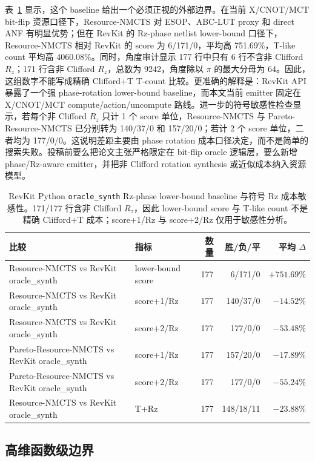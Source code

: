 \documentclass[UTF8,fontset=macnew,11pt]{ctexart}
\newcommand{\method}{Resource-NMCTS}
\newcommand{\mct}{\ensuremath{\mathrm{MCT}}}
\begin{document}
表~\ref{tab:revkit} 显示，这个 baseline 给出一个必须正视的外部边界。在当前 X/CNOT/\mct{} bit-flip 资源口径下，\method{} 对 ESOP、ABC-LUT proxy 和 direct ANF 有明显优势；但在 RevKit 的 Rz-phase netlist lower-bound 口径下，\method{} 相对 RevKit 的 score 为 6/171/0，平均高 751.69\%，T-like count 平均高 4060.08\%。同时，角度审计显示 177 行中只有 6 行不含非 Clifford $R_z$；171 行含非 Clifford $R_z$，总数为 9242，角度除以 $\pi$ 的最大分母为 64。因此，这组数字不能写成精确 Clifford+T T-count 比较。更准确的解释是：RevKit API 暴露了一个强 phase-rotation lower-bound baseline，而本文当前 emitter 固定在 X/CNOT/\mct{} compute/action/uncompute 路线。进一步的符号敏感性检查显示，若每个非 Clifford $R_z$ 只计 1 个 score 单位，\method{} 与 Pareto-\method{} 已分别转为 140/37/0 和 157/20/0；若计 2 个 score 单位，二者均为 177/0/0。这说明差距主要由 phase rotation 成本口径决定，而不是简单的搜索失败。投稿前要么把论文主张严格限定在 bit-flip oracle 逻辑层，要么新增 phase/Rz-aware emitter，并把非 Clifford rotation synthesis 或近似成本纳入资源模型。

\begin{table}[H]
\centering
\small
\caption{RevKit Python \texttt{oracle\_synth} Rz-phase lower-bound baseline 与符号 Rz 成本敏感性。171/177 行含非 Clifford $R_z$，因此 lower-bound score 与 T-like count 不是精确 Clifford+T 成本；score+1/Rz 与 score+2/Rz 仅用于敏感性分析。}
\label{tab:revkit}
\begin{tabularx}{\linewidth}{Xlrrr}
\toprule
比较 & 指标 & 数量 & 胜/负/平 & 平均 $\Delta$ \\
\midrule
\method{} vs RevKit oracle\_synth & lower-bound score & 177 & 6/171/0 & $+751.69\%$ \\
\method{} vs RevKit oracle\_synth & score+1/Rz & 177 & 140/37/0 & $-14.52\%$ \\
\method{} vs RevKit oracle\_synth & score+2/Rz & 177 & 177/0/0 & $-53.48\%$ \\
Pareto-\method{} vs RevKit oracle\_synth & score+1/Rz & 177 & 157/20/0 & $-17.89\%$ \\
Pareto-\method{} vs RevKit oracle\_synth & score+2/Rz & 177 & 177/0/0 & $-55.24\%$ \\
\method{} vs RevKit oracle\_synth & T+Rz & 177 & 148/18/11 & $-23.88\%$ \\
\bottomrule
\end{tabularx}
\end{table}

\subsection{高维函数级边界}
\end{document}
